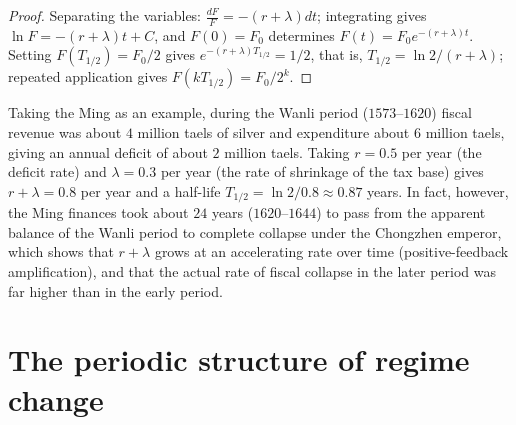 \begin{proof}
Separating the variables: $\frac{dF}{F} = -(r+\lambda)dt$; integrating gives $\ln F = -(r+\lambda)t + C$, and $F(0) = F_0$ determines $F(t) = F_0 e^{-(r+\lambda)t}$. Setting $F(T_{1/2}) = F_0/2$ gives $e^{-(r+\lambda)T_{1/2}} = 1/2$, that is, $T_{1/2} = \ln 2/(r+\lambda)$; repeated application gives $F(kT_{1/2}) = F_0/2^k$.
\end{proof}

\begin{example}\label{ex:ming_fiscal_collapse}
Taking the Ming as an example, during the Wanli period ($1573$--$1620$) fiscal revenue was about $4$ million taels of silver and expenditure about $6$ million taels, giving an annual deficit of about $2$ million taels. Taking $r=0.5$ per year (the deficit rate) and $\lambda=0.3$ per year (the rate of shrinkage of the tax base) gives $r+\lambda=0.8$ per year and a half-life $T_{1/2}=\ln2/0.8\approx0.87$ years. In fact, however, the Ming finances took about $24$ years ($1620$--$1644$) to pass from the apparent balance of the Wanli period to complete collapse under the Chongzhen emperor, which shows that $r+\lambda$ grows at an accelerating rate over time (positive-feedback amplification), and that the actual rate of fiscal collapse in the later period was far higher than in the early period.
\end{example}

\section{The periodic structure of regime change}

